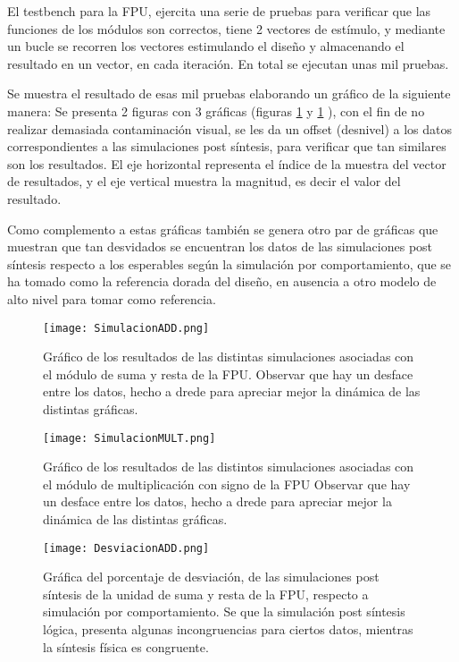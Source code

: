 El testbench para la FPU, ejercita una serie de pruebas para verificar que las funciones de los módulos son correctos, tiene 2 vectores de estímulo, y mediante un bucle se recorren los vectores estimulando el diseño y almacenando el resultado en un vector, en cada iteración. En total se ejecutan unas mil pruebas.

Se muestra el resultado de esas mil pruebas elaborando un gráfico de la siguiente manera: Se presenta 2 figuras con 3 gráficas (figuras \ref{fig:sim_add} y \ref{fig:sim_add} ), con el fin de no realizar demasiada contaminación visual, se les da un offset (desnivel) a los datos correspondientes a las simulaciones post síntesis, para verificar que tan similares son los resultados. El eje horizontal representa el índice de la muestra del vector de resultados, y el eje vertical muestra la magnitud, es decir el valor del resultado.

Como complemento a estas gráficas también se genera otro par de gráficas que muestran que tan desvidados se encuentran los datos de las simulaciones post síntesis respecto a los esperables según la simulación por comportamiento, que se ha tomado como la referencia dorada del diseño, en ausencia a otro modelo de alto nivel para tomar como referencia.

\newpage


\begin{figure}[h]
\texttt{[image: SimulacionADD.png]}
\centering
\caption{Gráfico de los resultados de las distintas simulaciones asociadas con el módulo de suma y resta de la FPU. Observar que hay un desface entre los datos, hecho a drede para apreciar mejor la dinámica de las distintas gráficas.}
\label{fig:sim_add}
\end{figure}

\begin{figure}[h]
\texttt{[image: SimulacionMULT.png]}
\centering
\caption{Gráfico de los resultados de las distintos simulaciones asociadas con el módulo de multiplicación con signo de la FPU Observar que hay un desface entre los datos, hecho a drede para apreciar mejor la dinámica de las distintas gráficas.}
\label{fig:sim_mult}
\end{figure}

\newpage


\begin{figure}[h]
\texttt{[image: DesviacionADD.png]}
\centering
\caption{Gráfica del porcentaje de desviación, de las simulaciones post síntesis de la unidad de suma y resta de la FPU, respecto a simulación por comportamiento. Se que la simulación post síntesis lógica, presenta algunas incongruencias para ciertos datos, mientras la síntesis física es congruente.}
\label{fig:desv_add}
\end{figure}

